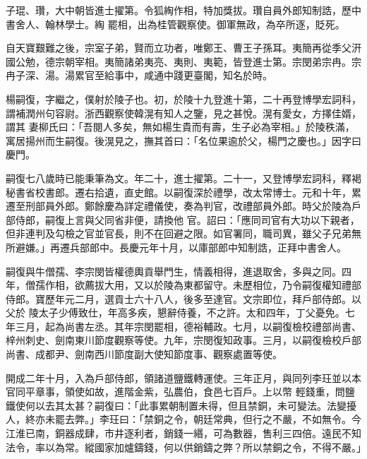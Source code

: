 \begin{pinyinscope}
 子琨、瓚，大中朝皆進士擢第。令狐綯作相，特加獎拔。瓚自員外郎知制誥，歷中書舍人、翰林學士。綯
 罷相，出為桂管觀察使。御軍無政，為卒所逐，貶死。



 自天寶艱難之後，宗室子弟，賢而立功者，唯鄭王、曹王子孫耳。夷簡再從季父汧國公勉，德宗朝宰相。夷簡諸弟夷亮、夷則、夷範，皆登進士第。宗閔弟宗冉。宗冉子深、湯。湯累官至給事中，咸通中踐更臺閣，知名於時。



 楊嗣復，字繼之，僕射於陵子也。初，於陵十九登進十第，二十再登博學宏詞科，謂補潤州句容尉。浙西觀察使韓滉有知人之鑒，見之甚悅。滉有愛女，方擇佳婿，謂其
 妻柳氏曰：「吾閱人多矣，無如楊生貴而有壽，生子必為宰相。」於陵秩滿，寓居揚州而生嗣復。後滉見之，撫其首曰：「名位果逾於父，楊門之慶也。」因字曰慶門。



 嗣復七八歲時已能秉筆為文。年二十，進士擢第。二十一，又登博學宏詞科，釋褐秘書省校書郎。遷右拾遺，直史館。以嗣復深於禮學，改太常博士。元和十年，累遷至刑部員外郎。鄭餘慶為詳定禮儀使，奏為判官，改禮部員外郎。時父於陵為戶部侍郎，嗣復上言與父同省非便，請換他
 官。詔曰：「應同司官有大功以下親者，但非連判及勾檢之官並官長，則不在回避之限。如官署同，職司異，雖父子兄弟無所避嫌。」再遷兵部郎中。長慶元年十月，以庫部郎中知制誥，正拜中書舍人。



 嗣復與牛僧孺、李宗閔皆權德輿貢舉門生，情義相得，進退取舍，多與之同。四年，僧孺作相，欲薦拔大用，又以於陵為東都留守。未歷相位，乃令嗣復權知禮部侍郎。寶歷年元二月，選貢士六十八人，後多至達官。文宗即位，拜戶部侍郎。以父於
 陵太子少傅致仕，年高多疾，懇辭侍養，不之許。太和四年，丁父憂免。七年三月，起為尚書左丞。其年宗閔罷相，德裕輔政。七月，以嗣復檢校禮部尚書、梓州刺史、劍南東川節度觀察等使。九年，宗閔復知政事。三月，以嗣復檢校戶部尚書、成都尹、劍南西川節度副大使知節度事、觀察處置等使。



 開成二年十月，入為戶部侍郎，領諸道鹽鐵轉運使。三年正月，與同列李玨並以本官同平章事，領使如故，進階金紫，弘農伯，食邑七百戶。上以幣
 輕錢重，問鹽鐵使何以去其太甚？嗣復曰：「此事累朝制置未得，但且禁銅，未可變法。法變擾人，終亦未罷去弊。」李玨曰：「禁銅之令，朝廷常典，但行之不嚴，不如無令。今江淮已南，銅器成肆，市井逐利者，銷錢一緡，可為數器，售利三四倍。遠民不知法令，率以為常。縱國家加爐鑄錢，何以供銷鑄之弊？所以禁銅之令，不得不嚴。」




\end{pinyinscope}
